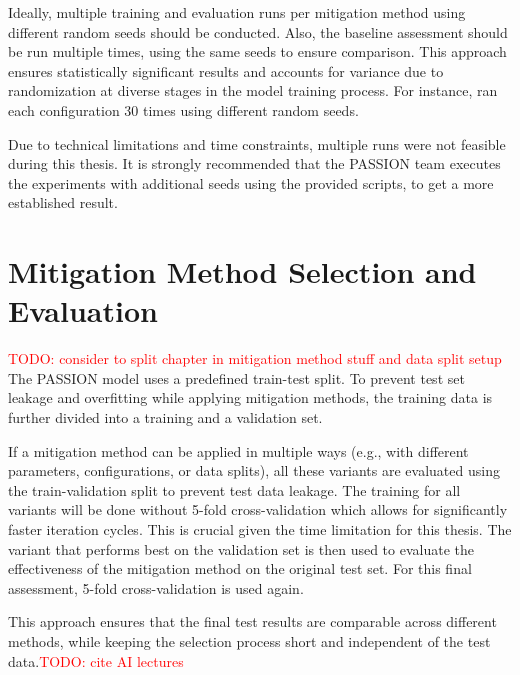 \documentclass[12pt, a4paper, oneside]{book}   	%
\renewcommand{\todo}[1]{\textcolor{red}{TODO: #1}}
\begin{document}
			Ideally, multiple training and evaluation runs per mitigation method using different random seeds should be conducted. Also, the baseline assessment should be run multiple times, using the same seeds to ensure comparison. This approach ensures statistically significant results and accounts for variance due to randomization at diverse stages in the model training process. For instance, \textcite{Valentim_2019} ran each configuration 30 times using different random seeds.
			
			Due to technical limitations and time constraints, multiple runs were not feasible during this thesis. It is strongly recommended that the PASSION team executes the experiments with additional seeds using the provided scripts, to get a more established result.
		
		
		\section{Mitigation Method Selection and Evaluation} \label{chap:mitigationMethodsApplyMethod} \todo{consider to split chapter in mitigation method stuff and data split setup}
		The PASSION model uses a predefined train-test split. To prevent test set leakage and overfitting while applying mitigation methods, the training data is further divided into a training and a validation set. 
		
		If a mitigation method can be applied in multiple ways (e.g., with different parameters, configurations, or data splits), all these variants are evaluated using the train-validation split to prevent test data leakage. The training for all variants will be done without 5-fold cross-validation which allows for significantly faster iteration cycles. This is crucial given the time limitation for this thesis. The variant that performs best on the validation set is then used to evaluate the effectiveness of the mitigation method on the original test set. For this final assessment, 5-fold cross-validation is used again.
		
		This approach ensures that the final test results are comparable across different methods, while keeping the selection process short and independent of the test data.\todo{cite AI lectures}

		
\end{document}
